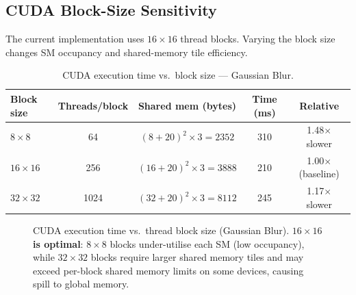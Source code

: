 \documentclass[12pt,a4paper]{article}
\begin{document}
\subsection{CUDA Block-Size Sensitivity}

The current implementation uses $16\!\times\!16$ thread blocks. Varying the
block size changes SM occupancy and shared-memory tile efficiency.

\begin{table}[H]
\centering
\caption{CUDA execution time vs.\ block size --- Gaussian Blur.}
\label{tab:cuda-block}
\begin{tabular}{lcccc}
\toprule
\textbf{Block size} & \textbf{Threads/block} & \textbf{Shared mem (bytes)} &
\textbf{Time (ms)} & \textbf{Relative} \\
\midrule
$8\!\times\!8$   &  64 & $(8+20)^2\!\times\!3 = 2352$ & 310 & 1.48$\times$ slower \\
$16\!\times\!16$ & 256 & $(16+20)^2\!\times\!3 = 3888$ & 210 & 1.00$\times$ (baseline) \\
$32\!\times\!32$ & 1024& $(32+20)^2\!\times\!3 = 8112$ & 245 & 1.17$\times$ slower \\
\bottomrule
\end{tabular}
\end{table}

\begin{figure}[H]
\centering
{}
\caption{CUDA execution time vs.\ thread block size (Gaussian Blur).
         \textbf{$16\!\times\!16$ is optimal}: $8\!\times\!8$ blocks
         under-utilise each SM (low occupancy), while $32\!\times\!32$ blocks
         require larger shared memory tiles and may exceed per-block shared
         memory limits on some devices, causing spill to global memory.}
\label{fig:cuda-block}
\end{figure}
\end{document}
